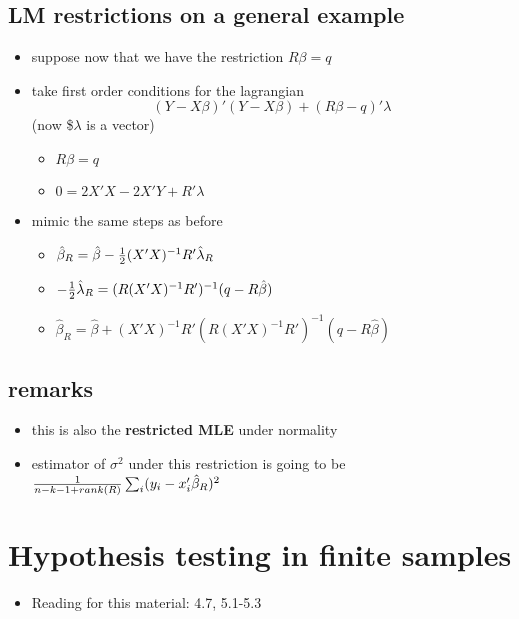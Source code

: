 \subsection{LM restrictions on a general example}

\begin{itemize}
\item suppose now that we have the restriction $R\beta = q$
\item take first order conditions for the lagrangian
      \[ (Y - X\beta)'(Y - X\beta) + (R\beta - q)'\lambda \]
      (now \$$\lambda$ is a vector)
\begin{itemize}
\item $R\beta = q$
\item $0 = 2 X'X - 2 X'Y + R' \lambda$
\end{itemize}
\item mimic the same steps as before
\begin{itemize}
\item $\hat\beta_R = \hat\beta - {1\over2} (X'X)^{-1} R'\hat\lambda_R$
\item $-{1\over2} \hat\lambda_R = (R(X'X)^{-1}R')^{-1}(q - R\hat\beta)$
\item $\hat\beta_R = \hat\beta + (X'X)^{-1} R'(R(X'X)^{-1}R')^{-1}
        (q - R\hat\beta)$
\end{itemize}
\end{itemize}

\subsection{remarks}

\begin{itemize}
\item this is also the \textbf{restricted MLE} under normality
\item estimator of $\sigma^2$ under this restriction is going to be ${1
      \over n - k - 1 + rank(R)} \sum_i (y_i - x_i'\hat\beta_R)^2$
\end{itemize}

\section{Hypothesis testing in finite samples}

\begin{itemize}
\item Reading for this material: \citet{Gre_2011} 4.7, 5.1-5.3
\end{itemize}

